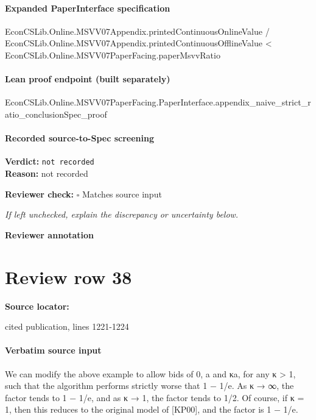 \documentclass[10pt]{article}
\newcommand{\reviewerbox}{%
  \par\noindent\fbox{\parbox{0.96\linewidth}{\rule{0pt}{0.38in}}}\par
}
\newcommand{\reviewmatch}[1]{%
  \par\noindent\textbf{Reviewer check:} $\square$\; #1\par
  \noindent\emph{If left unchecked, explain the discrepancy or uncertainty below.}\par
}
\begin{document}
\paragraph{Expanded PaperInterface specification}
\begin{ReviewVerbatim}
EconCSLib.Online.MSVV07Appendix.printedContinuousOnlineValue /
    EconCSLib.Online.MSVV07Appendix.printedContinuousOfflineValue <
  EconCSLib.Online.MSVV07PaperFacing.paperMsvvRatio
\end{ReviewVerbatim}

\paragraph{Lean proof endpoint (built separately)}\begin{ReviewVerbatim}
EconCSLib.Online.MSVV07PaperFacing.PaperInterface.appendix_naive_strict_ratio_conclusionSpec_proof
\end{ReviewVerbatim}

\paragraph{Recorded source-to-Spec screening}
\textbf{Verdict:} \texttt{not recorded}
\\
\textbf{Reason:} not recorded
\reviewmatch{Matches source input}
\noindent\textbf{Reviewer annotation}\par
\reviewerbox
\clearpage
\hypertarget{source-claim-859c7b427f0b756b}{}
\section*{Review row 38}
\textbf{Source locator:} {\footnotesize\raggedright cited publication, lines 1221-\allowbreak{}1224\par}
\paragraph{Verbatim source input}
\begin{ReviewVerbatim}
We can modify the above example to allow bids of 0, a and κa, for any κ > 1, such that the
algorithm performs strictly worse that 1 − 1/e.
As κ → ∞, the factor tends to 1 − 1/e, and as κ → 1, the factor tends to 1/2. Of course, if
κ = 1, then this reduces to the original model of [KP00], and the factor is 1 − 1/e.
\end{ReviewVerbatim}
\end{document}
